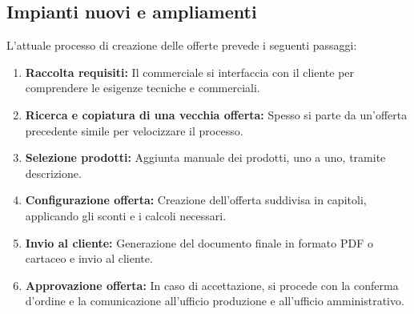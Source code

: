 \subsection{Impianti nuovi e ampliamenti}
L'attuale processo di creazione delle offerte prevede i seguenti passaggi:
\begin{enumerate}
      \item \textbf{Raccolta requisiti:} Il commerciale si interfaccia con il cliente per comprendere le
            esigenze tecniche e commerciali.
      \item \textbf{Ricerca e copiatura di una vecchia offerta:} Spesso si parte da un'offerta precedente simile
            per velocizzare il processo.
      \item \textbf{Selezione prodotti:} Aggiunta manuale dei prodotti, uno a uno, tramite descrizione.
      \item \textbf{Configurazione offerta:} Creazione dell'offerta suddivisa in capitoli, applicando gli sconti
            e i calcoli necessari.
      \item \textbf{Invio al cliente:} Generazione del documento finale in formato PDF o cartaceo e invio al cliente.
      \item \textbf{Approvazione offerta:} In caso di accettazione, si procede con la conferma d'ordine e
            la comunicazione all'ufficio produzione e all'ufficio amministrativo.
\end{enumerate}

